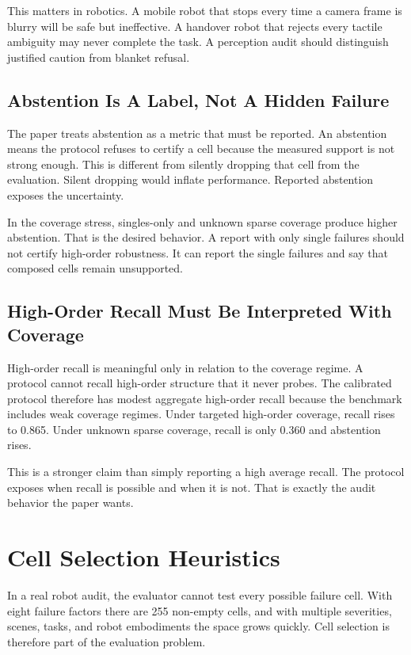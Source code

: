 \documentclass{article}
\begin{document}
This matters in robotics. A mobile robot that stops every time a camera frame is blurry will be safe but ineffective. A handover robot that rejects every tactile ambiguity may never complete the task. A perception audit should distinguish justified caution from blanket refusal.

\subsection{Abstention Is A Label, Not A Hidden Failure}

The paper treats abstention as a metric that must be reported. An abstention means the protocol refuses to certify a cell because the measured support is not strong enough. This is different from silently dropping that cell from the evaluation. Silent dropping would inflate performance. Reported abstention exposes the uncertainty.

In the coverage stress, singles-only and unknown sparse coverage produce higher abstention. That is the desired behavior. A report with only single failures should not certify high-order robustness. It can report the single failures and say that composed cells remain unsupported.

\subsection{High-Order Recall Must Be Interpreted With Coverage}

High-order recall is meaningful only in relation to the coverage regime. A protocol cannot recall high-order structure that it never probes. The calibrated protocol therefore has modest aggregate high-order recall because the benchmark includes weak coverage regimes. Under targeted high-order coverage, recall rises to 0.865. Under unknown sparse coverage, recall is only 0.360 and abstention rises.

This is a stronger claim than simply reporting a high average recall. The protocol exposes when recall is possible and when it is not. That is exactly the audit behavior the paper wants.

\section{Cell Selection Heuristics}

In a real robot audit, the evaluator cannot test every possible failure cell. With eight failure factors there are 255 non-empty cells, and with multiple severities, scenes, tasks, and robot embodiments the space grows quickly. Cell selection is therefore part of the evaluation problem.
\end{document}
